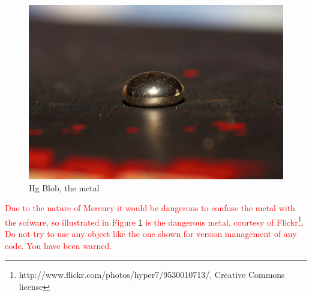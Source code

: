 \begin{figure}[h]

\includegraphics[width=\textwidth]{images/hg_blob_small.jpg}

\caption{Hg Blob, the metal}
\label{fig:hgblob}
\end{figure}

\textcolor{red}{Due to the nature of Mercury it would be dangerous to confuse the metal with the sofware, so illustrated in Figure \ref{fig:hgblob} is the dangerous metal, courtesy of Flickr\footnote{http://www.flickr.com/photos/hyper7/9530010713/, Creative Commons license}. Do not try to use any object like the one shown for version management of any code. You have been warned.}



